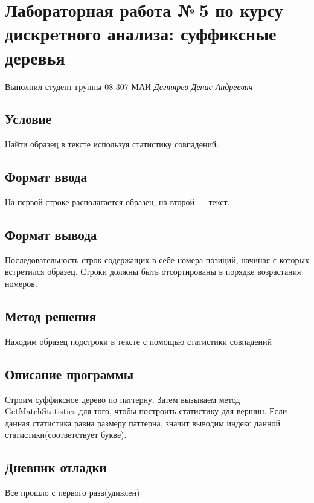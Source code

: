 \documentclass[12pt]{article}
\begin{document}
\section*{Лабораторная работа №\,5 по курсу дискрeтного анализа: суффиксные деревья}

Выполнил студент группы 08-307 МАИ \textit{Дегтярев Денис Андреевич}.

\subsection*{Условие}

Найти образец в тексте используя статистику совпадений.

\subsection*{Формат ввода}

На первой строке располагается образец, на второй — текст.

\subsection*{Формат вывода}

Последовательность строк содержащих в себе номера позиций, начиная с которых встретился образец. Строки должны быть отсортированы в порядке возрастания номеров.

\subsection*{Метод решения}

Находим образец подстроки в тексте с помощью статистики совпадений

\subsection*{Описание программы}

Строим суффиксное дерево по паттерну. Затем вызываем метод GetMatchStatistics для того, чтобы построить статистику для вершин. Если данная статистика равна размеру паттерна, значит выводим индекс данной статистики(соответствует букве).

\subsection*{Дневник отладки}  
  
Все прошло с первого раза(удивлен)
\end{document}
